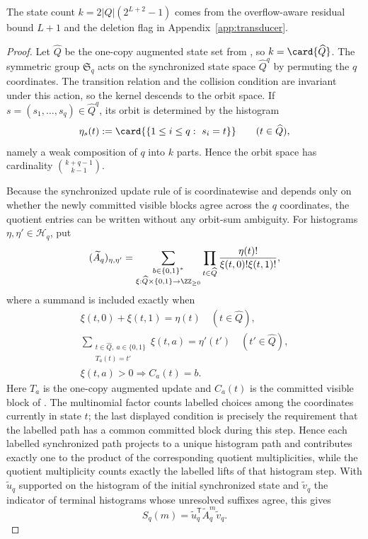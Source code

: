 \begin{remark}
The state count \(k=2|Q|(2^{L+2}-1)\) comes from the overflow-aware residual
bound \(L+1\) and the deletion flag in Appendix~\ref{app:transducer}.
\end{remark}

\begin{proof}
Let \(\widehat Q\) be the one-copy augmented state set from
, so \(k=\card{\widehat Q}\).  The
symmetric group \(\mathfrak S_q\) acts on the synchronized state space
\(\widehat Q^q\) by permuting the \(q\) coordinates.  The transition relation
and the collision condition are invariant under this action, so the kernel
descends to the orbit space.  If \(s=(s_1,\dots,s_q)\in \widehat Q^q\), its
orbit is determined by the histogram
\[
  \eta_s(t):=\card{\{1\le i\le q:\ s_i=t\}}
  \qquad (t\in \widehat Q),
\]
namely a weak composition of \(q\) into \(k\) parts.  Hence the orbit space has
cardinality \(\binom{k+q-1}{k-1}\).

Because the synchronized update rule of
 is coordinatewise and depends only on
whether the newly committed visible blocks agree across the \(q\) coordinates,
the quotient entries can be written without any orbit-sum ambiguity.  For
histograms \(\eta,\eta'\in\mathcal H_q\), put
\[
(\widetilde A_q)_{\eta,\eta'}
=
\sum_{\substack{b\in\{0,1\}^*\\
                \xi:\widehat Q\times\{0,1\}\to\ZZ_{\ge0}}}
\prod_{t\in\widehat Q}
\frac{\eta(t)!}{\xi(t,0)!\xi(t,1)!},
\]
where a summand is included exactly when
\[
\begin{gathered}
  \xi(t,0)+\xi(t,1)=\eta(t)\quad(t\in\widehat Q),\\
  \sum_{\substack{t\in\widehat Q,\ a\in\{0,1\}\\T_a(t)=t'}}
       \xi(t,a)=\eta'(t')\quad(t'\in\widehat Q),\\
  \xi(t,a)>0\Longrightarrow C_a(t)=b.
\end{gathered}
\]
Here \(T_a\) is the one-copy augmented update and \(C_a(t)\) is the committed
visible block of .  The multinomial
factor counts labelled choices among the coordinates currently in state \(t\);
the last displayed condition is precisely the requirement that the labelled
path has a common committed block during this step.  Hence each labelled
synchronized path projects to a unique histogram path and contributes exactly
one to the product of the corresponding quotient multiplicities, while the
quotient multiplicity counts exactly the labelled lifts of that histogram
step.  With \(\widetilde u_q\) supported on the histogram of the initial
synchronized state and \(\widetilde v_q\) the indicator of terminal histograms
whose unresolved suffixes agree, this gives
\[
  S_q(m)=\widetilde u_q^{\mathsf T}\widetilde A_q^m\widetilde v_q.
\]


\end{proof}
